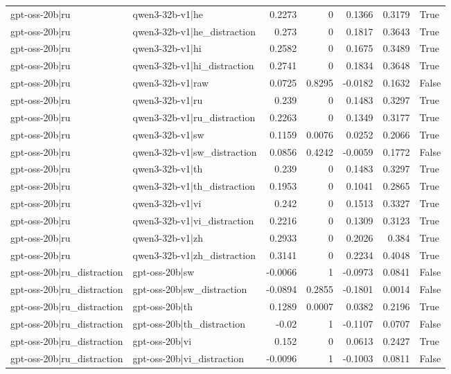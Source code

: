 \begin{table}
\begin{tabular}{l l r r r r l}
gpt-oss-20b|ru & qwen3-32b-v1|he & 0.2273 & 0 & 0.1366 & 0.3179 & True \\
gpt-oss-20b|ru & qwen3-32b-v1|he_distraction & 0.273 & 0 & 0.1817 & 0.3643 & True \\
gpt-oss-20b|ru & qwen3-32b-v1|hi & 0.2582 & 0 & 0.1675 & 0.3489 & True \\
gpt-oss-20b|ru & qwen3-32b-v1|hi_distraction & 0.2741 & 0 & 0.1834 & 0.3648 & True \\
gpt-oss-20b|ru & qwen3-32b-v1|raw & 0.0725 & 0.8295 & -0.0182 & 0.1632 & False \\
gpt-oss-20b|ru & qwen3-32b-v1|ru & 0.239 & 0 & 0.1483 & 0.3297 & True \\
gpt-oss-20b|ru & qwen3-32b-v1|ru_distraction & 0.2263 & 0 & 0.1349 & 0.3177 & True \\
gpt-oss-20b|ru & qwen3-32b-v1|sw & 0.1159 & 0.0076 & 0.0252 & 0.2066 & True \\
gpt-oss-20b|ru & qwen3-32b-v1|sw_distraction & 0.0856 & 0.4242 & -0.0059 & 0.1772 & False \\
gpt-oss-20b|ru & qwen3-32b-v1|th & 0.239 & 0 & 0.1483 & 0.3297 & True \\
gpt-oss-20b|ru & qwen3-32b-v1|th_distraction & 0.1953 & 0 & 0.1041 & 0.2865 & True \\
gpt-oss-20b|ru & qwen3-32b-v1|vi & 0.242 & 0 & 0.1513 & 0.3327 & True \\
gpt-oss-20b|ru & qwen3-32b-v1|vi_distraction & 0.2216 & 0 & 0.1309 & 0.3123 & True \\
gpt-oss-20b|ru & qwen3-32b-v1|zh & 0.2933 & 0 & 0.2026 & 0.384 & True \\
gpt-oss-20b|ru & qwen3-32b-v1|zh_distraction & 0.3141 & 0 & 0.2234 & 0.4048 & True \\
gpt-oss-20b|ru_distraction & gpt-oss-20b|sw & -0.0066 & 1 & -0.0973 & 0.0841 & False \\
gpt-oss-20b|ru_distraction & gpt-oss-20b|sw_distraction & -0.0894 & 0.2855 & -0.1801 & 0.0014 & False \\
gpt-oss-20b|ru_distraction & gpt-oss-20b|th & 0.1289 & 0.0007 & 0.0382 & 0.2196 & True \\
gpt-oss-20b|ru_distraction & gpt-oss-20b|th_distraction & -0.02 & 1 & -0.1107 & 0.0707 & False \\
gpt-oss-20b|ru_distraction & gpt-oss-20b|vi & 0.152 & 0 & 0.0613 & 0.2427 & True \\
gpt-oss-20b|ru_distraction & gpt-oss-20b|vi_distraction & -0.0096 & 1 & -0.1003 & 0.0811 & False \\

\end{tabular}
\end{table}
